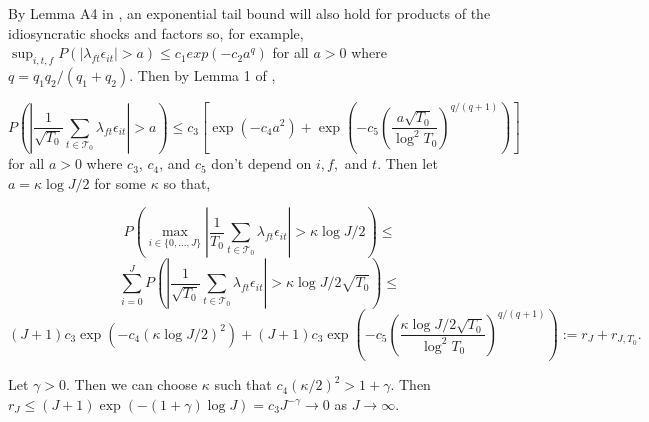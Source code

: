 \documentclass{article}
\begin{document}
By Lemma A4 in \cite{Dendramis2021}, an exponential tail bound will also hold for products of the idiosyncratic shocks and factors so, for example, 
$\sup_{i,t,f} P(|\lambda_{ft}\epsilon_{it}| > a) \leq c_1 exp(-c_2 a^{q})$ for all $a > 0$ where $q = q_1 q_2/(q_1 + q_2)$. Then by Lemma 1 of \cite{Dendramis2021},


$$P(|\frac{1}{\sqrt{T_0}} \sum_{t \in \mathcal{T}_0} \lambda_{ft}\epsilon_{it}| > a) \leq c_3 [\exp(-c_4 a^2) + \exp(-c_5 (\frac{a\sqrt{T_0}}{\log^2 T_0})^{q/(q+1)})]$$
for all $a >0$ where $c_3$, $c_4$, and $c_5$ don't depend on $i, f,$ and $t$. Then let $a = \kappa \log J/2$ for some $\kappa$ so that,

$$P(\max_{i \in \{0,...,J\}} |\frac{1}{T_0} \sum_{t \in \mathcal{T}_0} \lambda_{ft}\epsilon_{it}| > \kappa \log J/2) \leq $$
$$\sum_{i=0}^J P(|\frac{1}{\sqrt{T_0}} \sum_{t \in \mathcal{T}_0} \lambda_{ft}\epsilon_{it}| > \kappa \log J/2 \sqrt{T_0}) \leq $$
$$(J+1) c_3 \exp(-c_4 (\kappa \log J /2)^2) + (J+1)c_3 \exp(-c_5 (\frac{\kappa \log J /2\sqrt{T_0}}{\log^2 T_0})^{q/(q+1)}) := r_J + r_{J,T_0}.$$

Let $\gamma >0$. Then we can choose $\kappa$ such that $c_4 (\kappa/2)^2 > 1 + \gamma$. Then
$r_J \leq (J+1)\exp(-(1+\gamma) \log J) = c_3 J^{-\gamma} \rightarrow 0$ as $J \rightarrow \infty$.
\end{document}
